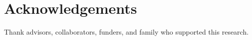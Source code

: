 \chapter*{Acknowledgements}

Thank advisors, collaborators, funders, and family who supported this research.
